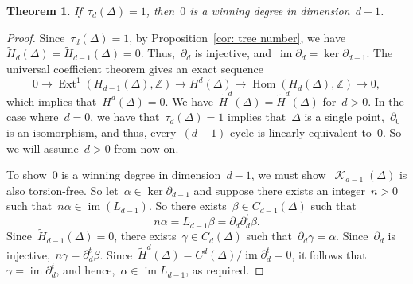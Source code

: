 \documentclass[12pt]{article}
\newcommand{\Z}{\mathbb{Z}}
\newcommand{\tH}{\widetilde{H}}
\DeclareMathOperator{\im}{\mathrm{im}}
\DeclareMathOperator{\Hom}{\mathrm{Hom}}
\DeclareMathOperator{\Ext}{\mathrm{Ext}}
\DeclareMathOperator{\crit}{\mathcal{K}}
\newtheorem{theorem}{Theorem}[section]
\theoremstyle{definition}
\theoremstyle{remark}
\begin{document}
\begin{theorem} If~$\tau_d(\Delta)=1$, then~$0$ is a winning degree in
  dimension~$d-1$. 
\end{theorem}
\begin{proof} Since~$\tau_d(\Delta)=1$, by Proposition~\ref{cor: tree number},
  we have~$\tH_d(\Delta)=\tH_{d-1}(\Delta)=0$.  Thus,~$\partial_d$ is injective,
  and~$\im\partial_d=\ker\partial_{d-1}$.
  The universal coefficient theorem gives an exact sequence
  \[
    0\to\Ext^1(H_{d-1}(\Delta),\Z)\to H^d(\Delta)\to\Hom(H_d(\Delta),\Z)\to0,
  \]
  which implies that~$H^d(\Delta)=0$. We have~$\tH^d(\Delta)=\tH^d(\Delta)$
  for~$d>0$.  In the case where~$d=0$, we have that~$\tau_d(\Delta)=1$ implies
  that~$\Delta$ is a single point,~$\partial_{0}$ is an isomorphism, and thus,
  every~$(d-1)$-cycle is linearly equivalent to~$0$.  So we will assume~$d>0$
  from now on.

  To show~$0$ is a winning degree
  in dimension~$d-1$, we must show~$\crit_{d-1}(\Delta)$ is also torsion-free.
  So let~$\alpha\in\ker\partial_{d-1}$ and suppose there exists an
  integer~$n>0$ such that~$n\alpha\in\im(L_{d-1})$.  So there exists~$\beta\in
  C_{d-1}(\Delta)$ such that
  \[
    n\alpha=L_{d-1}\beta=\partial_d\partial_d^t\beta.
  \]
  Since~$\tH_{d-1}(\Delta)=0$,
  there exists~$\gamma\in C_d(\Delta)$ such that~$\partial_d\gamma=\alpha$.  
  Since~$\partial_d$ is injective,~$n\gamma=\partial_d^t\beta$.
  Since~$\tH^d(\Delta)=C^d(\Delta)/\im\partial_d^t=0$, it follows
  that~$\gamma=\im\partial_d^t$, and hence,~$\alpha\in\im L_{d-1}$, as required.
\end{proof}
\end{document}
